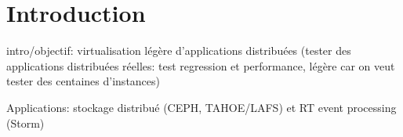 \section{Introduction}

intro/objectif: virtualisation légère d'applications distribuées (tester des applications distribuées réelles: test regression et performance, légère car on veut tester des centaines d'instances)

Applications: stockage distribué (CEPH, TAHOE/LAFS) et RT event processing (Storm)


